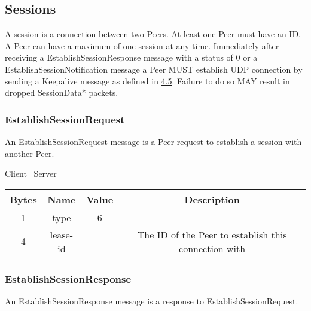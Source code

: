 \subsection{Sessions}

A session is a connection between two Peers. At least one Peer must have an ID. A Peer can have a maximum of one
session at any time. Immediately after receiving a EstablishSessionResponse message with a status
of 0 or a EstablishSessionNotification message a Peer MUST establish UDP connection by sending a
Keepalive message as defined in \hyperlink{subsection.4.5}{4.5}. Failure to do so MAY result in dropped
SessionData* packets.

\subsubsection{EstablishSessionRequest}

An EstablishSessionRequest message is a Peer request to establish a session with another Peer.

\begin{center}
    Client \textrightarrow\ Server\\
    \begin{tabular}{|c|c|c|c|}
        \hline
        \textbf{Bytes} & \textbf{Name} & \textbf{Value} & \textbf{Description}                                 \\
        \hline
        1              & type          & 6              &                                                      \\
        \hline
        4              & lease-id      &                & The ID of the Peer to establish this connection with \\
        \hline
    \end{tabular}
\end{center}

\subsubsection{EstablishSessionResponse}

An EstablishSessionResponse message is a response to EstablishSessionRequest.

